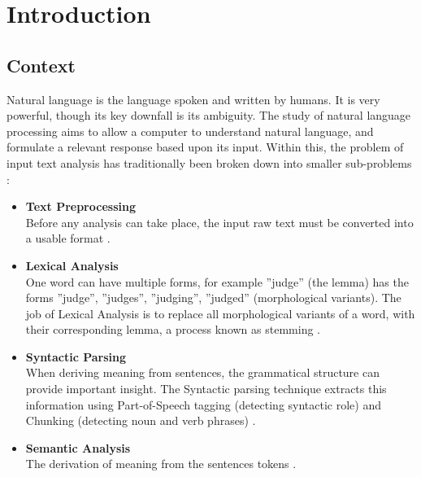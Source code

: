 \documentclass[]{article}
\begin{document}
\vfill

\newpage

\tableofcontents

\newpage

\section{Introduction}
\label{sec:Intro}

\subsection{Context}
\label{sec:IntroContext}

Natural language is the language spoken and written by humans. It is very powerful, though its key downfall is its ambiguity. The study of natural language processing aims to allow a computer to understand natural language, and formulate a relevant response based upon its input. Within this, the problem of input text analysis has traditionally been broken down into smaller sub-problems \cite{NLPHandbook}:

\begin{itemize}
	\item \textbf{Text Preprocessing} \\
	Before any analysis can take place, the input raw text must be converted into a usable format \cite{NLPHandbook}.
	\item \textbf{Lexical Analysis} \\
	One word can have multiple forms, for example ”judge” (the lemma) has the forms {”judge”, ”judges”, ”judging”, ”judged”} (morphological variants). The job of Lexical Analysis is to replace all morphological variants of a word, with their corresponding lemma, a process known as stemming \cite{NLPHandbook}.
	\item \textbf{Syntactic Parsing} \\
	When deriving meaning from sentences, the grammatical structure can provide important insight. The Syntactic parsing technique extracts this information using Part-of-Speech tagging (detecting syntactic role) and Chunking (detecting noun and verb phrases) \cite{NLPHandbook}.
	\item \textbf{Semantic Analysis} \\
	The derivation of meaning from the sentences tokens \cite{NLPHandbook}. 
\end{itemize}
\end{document}
